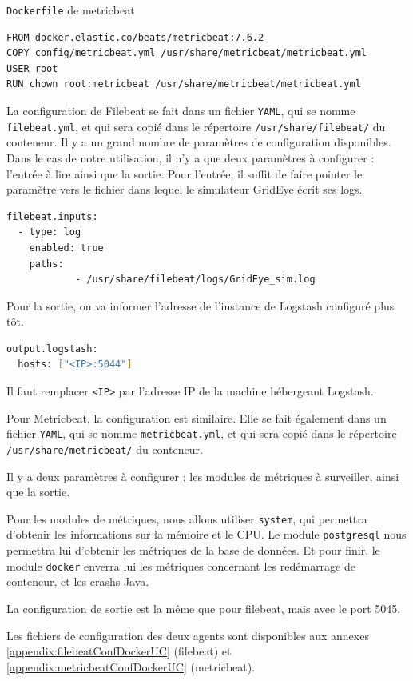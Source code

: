 \documentclass[paper=a4, fontsize=11pt]{scrartcl}
\begin{document}
\verb,Dockerfile, de metricbeat
\begin{lstlisting}
FROM docker.elastic.co/beats/metricbeat:7.6.2
COPY config/metricbeat.yml /usr/share/metricbeat/metricbeat.yml
USER root
RUN chown root:metricbeat /usr/share/metricbeat/metricbeat.yml
\end{lstlisting}

La configuration de Filebeat se fait dans un fichier \verb,YAML,, qui se nomme \verb,filebeat.yml,, et qui sera copié dans le répertoire \verb,/usr/share/filebeat/, du conteneur. Il y a un grand nombre de paramètres de configuration disponibles. Dans le cas de notre utilisation, il n'y a que deux paramètres à configurer : l'entrée à lire ainsi que la sortie.
Pour l'entrée, il suffit de faire pointer le paramètre vers le fichier dans lequel le simulateur GridEye écrit ses logs.
\begin{lstlisting}[language=bash]
filebeat.inputs:
  - type: log
    enabled: true
    paths:
            - /usr/share/filebeat/logs/GridEye_sim.log
\end{lstlisting}
Pour la sortie, on va informer l'adresse de l'instance de Logstash configuré plus tôt.
\begin{lstlisting}[language=bash]
output.logstash:
  hosts: ["<IP>:5044"]
\end{lstlisting}
Il faut remplacer \verb,<IP>, par l'adresse IP de la machine hébergeant Logstash.

Pour Metricbeat, la configuration est similaire. Elle se fait également dans un fichier \verb,YAML,, qui se nomme \verb,metricbeat.yml,, et qui sera copié dans le répertoire \verb,/usr/share/metricbeat/, du conteneur.

Il y a deux paramètres à configurer : les modules de métriques à surveiller, ainsi que la sortie.

Pour les modules de métriques, nous allons utiliser \verb,system,, qui permettra d'obtenir les informations sur la mémoire et le CPU. Le module \verb,postgresql, nous permettra lui d'obtenir les métriques de la base de données. Et pour finir, le module \verb,docker, enverra lui les métriques concernant les redémarrage de conteneur, et les crashs Java.

La configuration de sortie est la même que pour filebeat, mais avec le port 5045.

Les fichiers de configuration des deux agents sont disponibles aux annexes \ref{appendix:filebeatConfDockerUC} (filebeat) et \ref{appendix:metricbeatConfDockerUC} (metricbeat).
\end{document}
